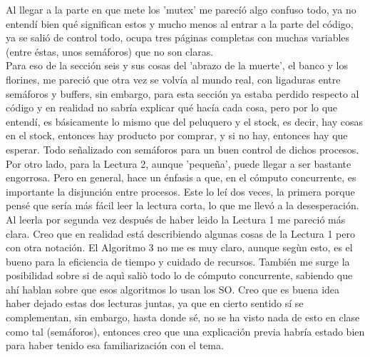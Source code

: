 \documentclass[12pt,a4paper]{article}
\begin{document}
Al llegar a la parte en que mete los 'mutex' me parecíó algo confuso todo, ya no entendí bien qué significan estos y mucho menos al entrar a la parte del código, ya se salió de control todo, ocupa tres páginas completas con muchas variables (entre éstas, unos semáforos) que no son claras.
\\

Para eso de la sección seis y sus cosas del 'abrazo de la muerte', el banco y los florines, me pareció que otra vez se volvía al mundo real, con ligaduras entre semáforos y buffers, sin embargo, para esta sección ya estaba perdido respecto al código y en realidad no sabría explicar qué hacía cada cosa, pero por lo que entendí, es básicamente lo mismo que del peluquero y el stock, es decir, hay cosas en el stock, entonces hay producto por comprar, y si no hay, entonces hay que esperar. Todo señalizado con semáforos para un buen control de dichos procesos.
\\

Por otro lado, para la Lectura 2, aunque 'pequeña', puede llegar a ser bastante engorrosa. Pero en general, hace un énfasis a que, en el cómputo concurrente, es importante la disjunción entre procesos. Este lo leí dos veces, la primera porque pensé que sería más fácil leer la lectura corta, lo que me llevó a la desesperación. Al leerla por segunda vez después de haber leido la Lectura 1 me pareció más clara. Creo que en realidad está describiendo algunas cosas de la Lectura 1 pero con otra notación. El Algoritmo 3 no me es muy claro, aunque segùn esto, es el bueno para la eficiencia de tiempo y cuidado de recursos. También me surge la posibilidad sobre si de aquì saliò todo lo de cómputo concurrente, sabiendo que ahí hablan sobre que esos algoritmos lo usan los SO. Creo que es buena idea haber dejado estas dos lecturas juntas, ya que en cierto sentido sí se complementan, sin embargo, hasta donde sé, no se ha visto nada de esto en clase como tal (semáforos), entonces creo que una explicación previa habría estado bien para haber tenido esa familiarización con el tema.
\end{document}

